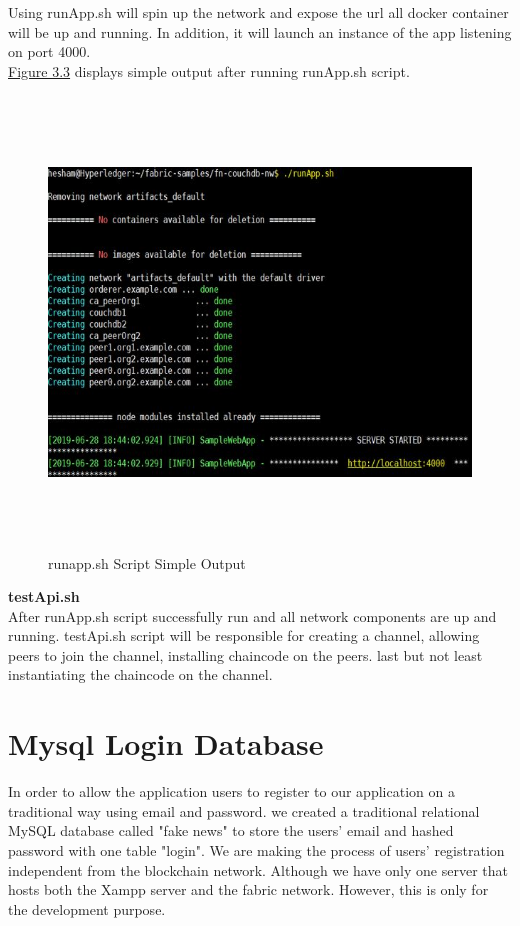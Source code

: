 Using runApp.sh will spin up the network and expose the url all docker container will be up and running. In addition, it will launch an instance of the app listening on port 4000. \\
\hyperref[fig:runapp]{Figure 3.3} displays simple output after running runApp.sh script. 
\ \\
 \begin{figure}[H]
\includegraphics[width=15cm,height=12cm]{images/runapp.jpg}
\caption{runapp.sh Script Simple Output}
\label{fig:runapp}
\end{figure}


\textbf{\large{testApi.sh}  }\\

After runApp.sh script successfully run and all network components are up and running. testApi.sh script will be responsible for creating a channel, allowing peers to join the channel, installing chaincode on the peers. last but not least instantiating the chaincode on the channel.
\cleardoublepage

\section{Mysql Login Database} 
In order to allow the application users to register to our application on a traditional way using email and password. we created a traditional relational MySQL database called "fake news" to store the users' email and hashed password with one table "login". 
We are making the process of users' registration independent from the blockchain network.
Although we have only one server that hosts both the Xampp server and the fabric network. However, this is only for the development purpose. 

